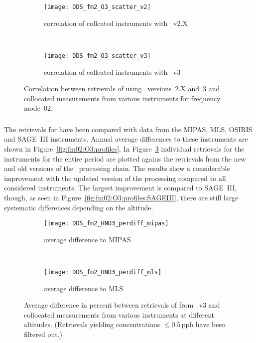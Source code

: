 \begin{figure}[htpb]
    \centering
    \begin{subfigure}[b]{0.49\textwidth}
        \texttt{[image: DDS\_fm2\_O3\_scatter\_v2]}
        \caption{correlation of collcated instruments with \smr~v2.X}
        \label{fig:fm02:O3:scatter:v2}
    \end{subfigure}
    \,
    \begin{subfigure}[b]{0.49\textwidth}
        \texttt{[image: DDS\_fm2\_O3\_scatter\_v3]}
        \caption{correlation of collcated instruments with \smr~v3}
        \label{fig:fm02:O3:scatter:v3}
    \end{subfigure}
    \caption{Correlation between retrievals of  using \smr\
    versions~2.X and~3 and collocated measurements from various instruments
    for frequency mode~02.}
    \label{fig:fm02:O3:scatter}
\end{figure}

\subsubsection{}
\label{sec:fm02:comparison:O3}
The retrievals for \chem{O_3} have been compared with data from the MIPAS, MLS,
OSIRIS and SAGE~III instruments. Annual average differences to these
instruments are shown in Figure~\ref{fig:fm02:O3:profiles}. In
Figure~\ref{fig:fm02:O3:scatter} individual retrievals for the instruments for
the entire period are plotted agains the retrievals from the new and old
versions of the \smr\ processing chain. The results show a considerable
improvement with the updated version of the processing compared to all
considered instruments. The largest improvement is compared to SAGE~III,
though, as seen in Figure~\ref{fig:fm02:O3:profiles:SAGEIII}, there are still
large systematic differences depending on the altitude.



\begin{figure}[htpb]
    \centering
    \begin{subfigure}[b]{0.49\textwidth}
        \texttt{[image: DDS\_fm2\_HNO3\_perdiff\_mipas]}
        \caption{average difference to MIPAS}
        \label{fig:fm02:HNO3:profiles:MIPAS}
    \end{subfigure}
    \,
    \begin{subfigure}[b]{0.49\textwidth}
        \texttt{[image: DDS\_fm2\_HNO3\_perdiff\_mls]}
        \caption{average difference to MLS}
        \label{fig:fm02:HNO3:profiles:MLS}
    \end{subfigure}
    \caption{Average difference in percent between retrievals of 
    from \smr~v3 and collocated measurements from various instruments at
    different altitudes. (Retrievals yielding concentrations
    $\leq 0.5\,\mathrm{ppb}$ have been filtered out.)}

    \label{fig:fm02:HNO3:profiles}
\end{figure}

